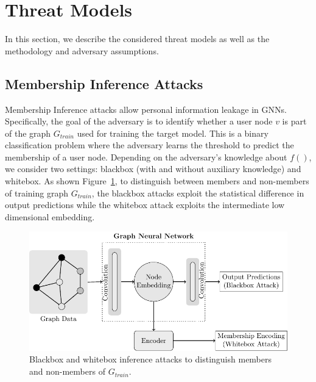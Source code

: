\section{Threat Models}
\label{attack}

In this section, we describe the considered threat models as well as the methodology and adversary assumptions.


\subsection{Membership Inference Attacks}

Membership Inference attacks allow personal information leakage in GNNs.
Specifically, the goal of the adversary is to identify whether a user node $v$ is part of the graph $G_{train}$ used for training the target model.
This is a binary classification problem where the adversary learns the threshold to predict the membership of a user node.
Depending on the adversary's knowledge about $f()$, we consider two settings: blackbox (with and without auxiliary knowledge) and whitebox. %
As shown Figure~\ref{mia}, to distinguish between members and non-members of training graph $G_{train}$, the blackbox attacks exploit the statistical difference in output predictions while the whitebox attack exploits the intermediate low dimensional embedding.


\begin{figure}[!htb]
\centering
\includegraphics[width=0.85\linewidth]{./figures/Attacks/MIA.pdf}
\caption{Blackbox and whitebox inference attacks to distinguish members and non-members of $G_{train}$.}
\label{mia}
\end{figure}


